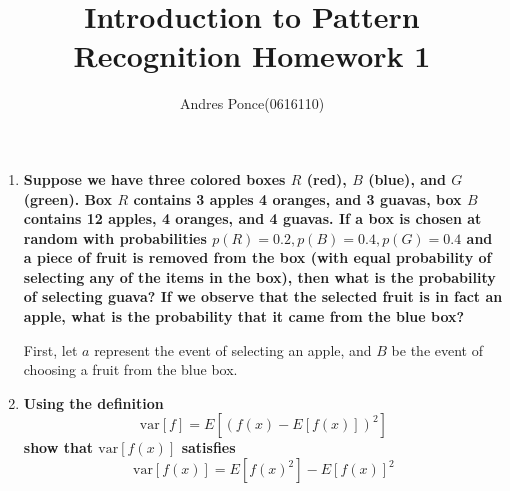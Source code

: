 \documentclass{article}
\title{Introduction to Pattern Recognition Homework 1}
\author{Andres Ponce(0616110)}
\begin{document}
\maketitle

\begin{enumerate}
	\item 
		\textbf{Suppose we have three colored boxes $R$ (red), $B$ (blue), 
		and $G$ (green). Box $R$ contains 3 apples 4 oranges, and 3
		guavas, box $B$ contains 12 apples, 4 oranges, and 4 guavas. If
		a box is chosen at random with probabilities $p(R)=0.2,p(B)=0.4,p(G)=0.4$
		and a piece of fruit is removed from the box (with equal probability of selecting
		any of the items in the box), then what is the probability of selecting guava? If
		we observe that the selected fruit is in fact an apple, what is the probability
		that it came from the blue box?}

		First, let $a$ represent the event of selecting an apple, and $B$ be 
		the event of choosing a fruit from the blue box.

	\item
		\textbf{Using the definition} \[\textrm{var}[f] = E[(f(x) - E[f(x)])^{2}] \]
		\textbf{show that $\textrm{var}[f(x)]$ satisfies}
		\[\textrm{var}[f(x)] = E[f(x)^{2}] - E[f(x)]^{2}\]

\end{enumerate}
\end{document}
